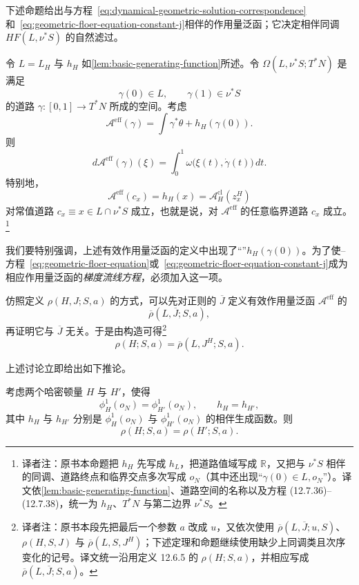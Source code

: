 下述命题给出与方程~\eqref{eq:dynamical-geometric-solution-correspondence}和~\eqref{eq:geometric-floer-equation-constant-j}相伴的作用量泛函；它决定相伴\personFloer{}同调 $HF(L,\nu^*S)$ 的自然滤过。

\begin{proposition}
\label{prop:effective-action-functional}
令 $L=L_H$ 与 $h_H$ 如\cref{lem:basic-generating-function}所述。令 $\Omega(L,\nu^*S;T^*N)$ 是满足
\[
  \gamma(0)\in L,
  \qquad
  \gamma(1)\in\nu^*S
\]
的道路 $\gamma:[0,1]\to T^*N$ 所成的空间。考虑\termEffectiveActionFunctional{}
\[
  \mathcal A^{\mathrm{eff}}(\gamma)
  =\int\gamma^*\theta+h_H(\gamma(0)).
\]
则
\[
  d\mathcal A^{\mathrm{eff}}(\gamma)(\xi)
  =\int_0^1\omega\bigl(\xi(t),\dot\gamma(t)\bigr)\,dt.
\]
特别地，
\begin{equation}
  \mathcal A^{\mathrm{eff}}(c_x)
  =h_H(x)
  =\mathcal A_H^{\mathrm{cl}}(z_x^H)
\label{eq:effective-action-at-constant-path}
\end{equation}
对常值道路 $c_x\equiv x\in L\cap\nu^*S$ 成立，也就是说，对 $\mathcal A^{\mathrm{eff}}$ 的任意临界道路 $c_x$ 成立。\footnote{译者注：原书本命题把 $h_H$ 先写成 $h_L$，把道路值域写成 $\mathbb R$，又把与 $\nu^*S$ 相伴的同调、道路终点和临界交点多次写成 $o_N$（其中还出现“$\gamma(0)\in L,o_N$”）。译文依\cref{lem:basic-generating-function}、道路空间的名称以及方程 (12.7.36)--(12.7.38)，统一为 $h_H$、$T^*N$ 与第二边界 $\nu^*S$。}
\end{proposition}

我们要特别强调，上述有效作用量泛函的定义中出现了“\termBoundaryContribution{}”$h_H(\gamma(0))$。为了使\personCauchy{}--\personRiemann{}方程~\eqref{eq:geometric-floer-equation}或~\eqref{eq:geometric-floer-equation-constant-j}成为相应作用量泛函的\emph{梯度流线方程}，必须加入这一项。

仿照定义 $\rho(H,J;S,a)$ 的方式，可以先对正则的 $\overline J$ 定义有效作用量泛函 $\mathcal A^{\mathrm{eff}}$ 的
\[
  \overline\rho(L,\overline J;S,a),
\]
再证明它与 $\overline J$ 无关。于是由构造可得\footnote{译者注：原书本段先把最后一个参数 $a$ 改成 $u$，又依次使用 $\overline\rho(L,\overline J;u,S)$、$\rho(H,S,J)$ 与 $\overline\rho(L,S,J^H)$；下述定理和命题继续使用缺少上同调类且次序变化的记号。译文统一沿用定义 12.6.5 的 $\rho(H;S,a)$，并相应写成 $\overline\rho(L,\overline J;S,a)$。}
\[
  \rho(H;S,a)=\overline\rho(L,J^H;S,a).
\]

上述讨论立即给出如下推论。

\begin{theorem}
\label{thm:spectral-invariant-depends-on-lagrangian-and-generator}
考虑两个哈密顿量 $H$ 与 $H'$，使得
\[
  \phi_H^1(o_N)=\phi_{H'}^1(o_N),
  \qquad
  h_H=h_{H'},
\]
其中 $h_H$ 与 $h_{H'}$ 分别是 $\phi_H^1(o_N)$ 与 $\phi_{H'}^1(o_N)$ 的相伴生成函数。则
\[
  \rho(H;S,a)=\rho(H';S,a).
\]
\end{theorem}

